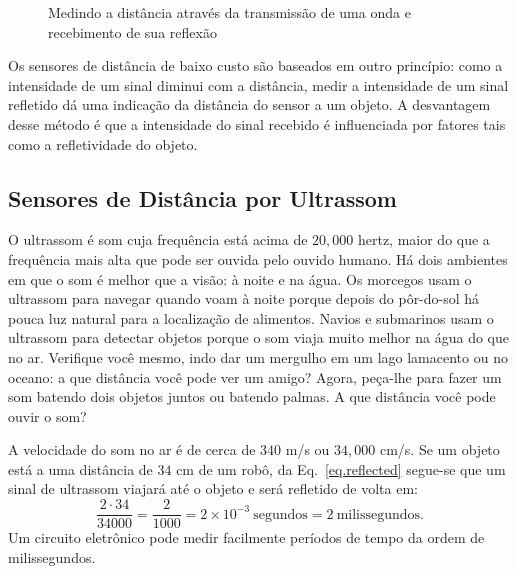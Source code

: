 \begin{figure}
\begin{center}
\end{center}
\caption{Medindo a distância através da transmissão de uma onda e recebimento de sua reflexão}\label{fig.measure-d}
\end{figure}

Os sensores de distância de baixo custo são baseados em outro princípio: como a intensidade de um sinal diminui com a distância, medir a intensidade de um sinal refletido dá uma indicação da distância do sensor a um objeto. A desvantagem desse método é que a intensidade do sinal recebido é influenciada por fatores tais como a refletividade do objeto.

\subsection{Sensores de Distância por Ultrassom}

O ultrassom é som cuja frequência está acima de $20,\!000$ hertz, maior do que a frequência mais alta que pode ser ouvida pelo ouvido humano. Há dois ambientes em que o som é melhor que a visão: à noite e na água. Os morcegos usam o ultrassom para navegar quando voam à noite porque depois do pôr-do-sol há pouca luz natural para a localização de alimentos. Navios e submarinos usam o ultrassom para detectar objetos porque o som viaja muito melhor na água do que no ar. Verifique você mesmo, indo dar um mergulho em um lago lamacento ou no oceano: a que distância você pode ver um amigo? Agora, peça-lhe para fazer um som batendo dois objetos juntos ou batendo palmas. A que distância você pode ouvir o som? 

A velocidade do som no ar é de cerca de $340$ m/s ou $34,\!000$ cm/s. Se um objeto está a uma distância de $34$ cm de um robô, da Eq.~\ref{eq.reflected} segue-se que um sinal de ultrassom viajará até o objeto e será refletido de volta em:
\[\frac{2\cdot 34}{34000} = \frac{2}{1000} = 2\times 10^{-3}\  \textrm{segundos} = 2\  \textrm{milissegundos}.\]
Um circuito eletrônico pode medir facilmente períodos de tempo da ordem de milissegundos.

